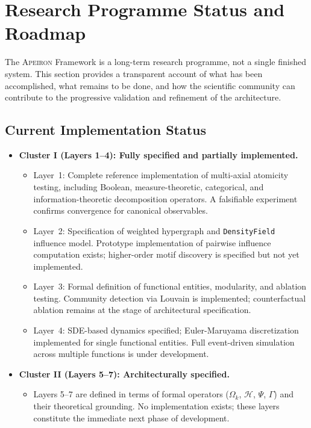 \section{Research Programme Status and Roadmap}
\label{sec:status}

The \textsc{Apeiron} Framework is a long-term research programme, not a single finished system. This section provides a transparent account of what has been accomplished, what remains to be done, and how the scientific community can contribute to the progressive validation and refinement of the architecture.

\subsection{Current Implementation Status}

\begin{itemize}
    \item \textbf{Cluster I (Layers 1--4): Fully specified and partially implemented.} 
    \begin{itemize}
        \item Layer~1: Complete reference implementation of multi-axial atomicity testing, including Boolean, measure-theoretic, categorical, and information-theoretic decomposition operators. A falsifiable experiment confirms convergence for canonical observables.
        \item Layer~2: Specification of weighted hypergraph and \texttt{DensityField} influence model. Prototype implementation of pairwise influence computation exists; higher-order motif discovery is specified but not yet implemented.
        \item Layer~3: Formal definition of functional entities, modularity, and ablation testing. Community detection via Louvain is implemented; counterfactual ablation remains at the stage of architectural specification.
        \item Layer~4: SDE-based dynamics specified; Euler-Maruyama discretization implemented for single functional entities. Full event-driven simulation across multiple functions is under development.
    \end{itemize}
    \item \textbf{Cluster II (Layers 5--7): Architecturally specified.} 
    \begin{itemize}
        \item Layers 5--7 are defined in terms of formal operators ($\Omega_k$, $\mathcal{H}$, $\Psi$, $\Gamma$) and their theoretical grounding. No implementation exists; these layers constitute the immediate next phase of development.

\end{itemize}
\end{itemize}
